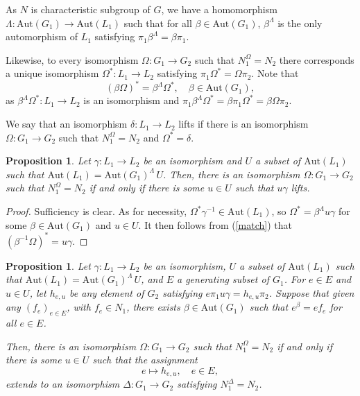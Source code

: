 \documentclass{amsart}
\newtheorem{prop}[theorem]{Proposition}
\theoremstyle{definition}
\theoremstyle{remark}
\begin{document}
As $N$ is characteristic subgroup of $G$, we have a homomorphism $\Lambda:\mathrm{Aut}(G_1)\to \mathrm{Aut}(L_1)$
such that for all $\beta\in \mathrm{Aut}(G_1)$, $\beta^{\Lambda}$ is the only automorphism of $L_1$ satisfying
$\pi_1 {\beta}^{\Lambda}=\beta\pi_1$. %

Likewise, to every isomorphism $\Omega:G_1\to G_2$ such that $N_1^\Omega=N_2$ there corresponds a unique
isomorphism $\Omega^*:L_1\to L_2$ satisfying $\pi_1\Omega^*=\Omega\pi_2$. Note that
\begin{equation}\label{match}
(\beta\Omega)^*=\beta^{\Lambda} \Omega^*,\quad \beta\in \mathrm{Aut}(G_1),
\end{equation}
as $\beta^{\Lambda} \Omega^*:L_1\to L_2$  is an isomorphism and $\pi_1\beta^{\Lambda} \Omega^*=\beta\pi_1\Omega^*=\beta\Omega\pi_2$.

We say that an isomorphism $\delta:L_1\to L_2$ lifts if there is an isomorphism $\Omega:G_1\to G_2$ such
that $N_1^\Omega=N_2$ and $\Omega^*=\delta$.

\begin{prop}\label{tool} Let $\gamma:L_1\to L_2$ be an isomorphism and $U$ a subset of $\mathrm{Aut}(L_1)$ such that
$\mathrm{Aut}(L_1)=\mathrm{Aut}(G_1)^{\Lambda}\, U$. Then, there is an isomorphism $\Omega:G_1\to G_2$ such that $N_1^\Omega=N_2$
if and only if there is some $u\in U$ such that $u\gamma$ lifts.
\end{prop}

\begin{proof} Sufficiency is clear. As for necessity, $\Omega^*\gamma^{-1}\in \mathrm{Aut}(L_1)$, so $\Omega^*=\beta^{\Lambda} u\gamma$
for some $\beta\in \mathrm{Aut}(G_1)$ and $u\in U$. It then follows from (\ref{match}) that
$(\beta^{-1}\Omega)^*=u\gamma$.
\end{proof}

\begin{prop}\label{tool2} Let $\gamma:L_1\to L_2$ be an isomorphism, $U$ a subset of $\mathrm{Aut}(L_1)$ such that
$\mathrm{Aut}(L_1)=\mathrm{Aut}(G_1)^\Lambda\, U$, and $E$ a generating subset of $G_1$.
For $e\in E$ and $u\in U$, let $h_{e,u}$ be any element of $G_2$ satisfying $e \pi_1 u \gamma=h_{e,u}\pi_2$.
Suppose that given
any $(f_e)_{e\in E}$, with $f_e\in N_1$, there exists $\beta\in \mathrm{Aut}(G_1)$ such that $e^\beta=e f_e$ for all $e\in E$.

Then, there is an isomorphism $\Omega:G_1\to G_2$ such that $N_1^\Omega=N_2$ if and only if
there is some $u\in U$ such that the assignment
$$
e\mapsto h_{e,u},\quad e\in E,
$$
extends to an isomorphism $\Delta:G_1\to G_2$ satisfying $N_1^\Delta=N_2$.
\end{prop}
\end{document}
